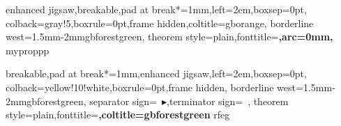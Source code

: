 \usepackage[listings,theorems,most]{tcolorbox}
\newcommand{\bibliofmt}[1]{\medskip\textcolor{gbforestgreen}{\heiti#1}}

{enhanced jigsaw,breakable,pad at break*=1mm,left=2em,boxsep=0pt,
 colback=gray!5,boxrule=0pt,frame hidden,coltitle=gborange,
 borderline west={1.5mm}{-2mm}{gbforestgreen},
 theorem style=plain,fonttitle=\bfseries\heiti,arc=0mm,
}{myprop}{pp}

{breakable,pad at break*=1mm,enhanced jigsaw,left=2em,boxsep=0pt,
 colback=yellow!10!white,boxrule=0pt,frame hidden,
 borderline west={1.5mm}{-2mm}{gbforestgreen},
separator sign={\ $\blacktriangleright$},terminator sign={\ },
theorem style=plain,fonttitle=\bfseries\heiti,coltitle=gbforestgreen
}{rfeg}


\newcommand{\titleformanual}[1]{\def\biaotiudf{#1}}
\newcommand{\authorformanual}[1]{\def\zuozheudf{#1}}
\newcommand{\dateformanual}[1]{\def\riqiudf{#1}}
\def\temp{}
\makeatletter
\newcommand{\titleandauthor}{
\begin{center}
\def\@makefnmark{\hbox{\@textsuperscript{\small\@thefnmark}}}
{\setlength{\baselineskip}{40pt}\renewcommand{\thefootnote}{\fnsymbol{footnote}}
\heiti{\zihao{-2}{\biaotiudf}}\par}%
\setlength{\baselineskip}{0.1cm}
\rule{0pt}{0.5cm}\par
{\renewcommand{\thefootnote}{\arabic{footnote}}
\kaishu{\zihao{4}{\zuozheudf}}\par}
\rule{0pt}{0.3cm}\par
{\songti{\zihao{-4}{\riqiudf}}\par}
\end{center}
}
\makeatother


